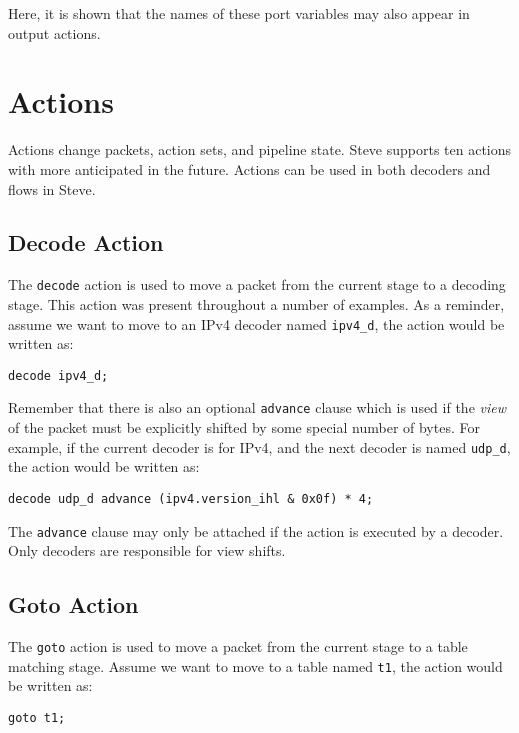 Here, it is shown that the names of these port variables may also appear in output actions.

\section{Actions} \label{tut:action}

Actions change packets, action sets, and pipeline state. Steve supports ten actions with more anticipated in the future. Actions can be used in both decoders and flows in Steve.

\subsection{Decode Action} \label{tut:decode_action}

The \texttt{decode} action is used to move a packet from the current stage to a decoding stage. This action was present throughout a number of examples. As a reminder, assume we want to move to an IPv4 decoder named \texttt{ipv4\_d}, the action would be written as:

\begin{lstlisting}
decode ipv4_d;
\end{lstlisting}

Remember that there is also an optional \texttt{advance} clause which is used if the \textit{view} of the packet must be explicitly shifted by some special number of bytes. For example, if the current decoder is for IPv4, and the next decoder is named \texttt{udp\_d}, the action would be written as:

\begin{lstlisting}
decode udp_d advance (ipv4.version_ihl & 0x0f) * 4;
\end{lstlisting}

The \texttt{advance} clause may only be attached if the action is executed by a decoder. Only decoders are responsible for view shifts.

\subsection{Goto Action} \label{tut:goto_action}

The \texttt{goto} action is used to move a packet from the current stage to a table matching stage. Assume we want to move to a table named \texttt{t1}, the action would be written as:

\begin{lstlisting}
goto t1;
\end{lstlisting}

